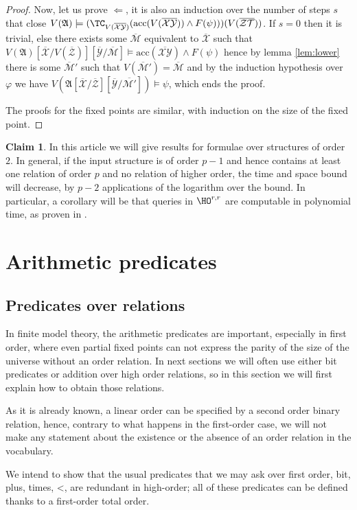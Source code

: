 \documentclass[a4paper,12pt]{article}
\theoremstyle{definition}
\newtheorem{claim}[theorem]{Claim}
\renewcommand{\phi}{\varphi}
\newcommand{\hod}[2]{\ensuremath{\HO^{#1,#2}}}
\newcommand{\mc}{\mathcal}
\newcommand{\mf}{\mathfrak}
\newcommand{\ol}{\overline}
\newcommand{\olmc}[1]{\overline{\mathcal{#1}}}
\begin{document}
\begin{proof}
Now, let us prove $\Leftarrow$, it is also an induction over the number
of steps $s$ that close $V(\mf A)\models(\TC_{V(\ol{\mc
    X}\ol{\mc Y})}(\text{acc}(V(\olmc{XY}))\land
F(\psi)))(V(\ol{\mc Z\mc T}))$. If $s=0$ then it is trivial,
else there exists some $\olmc M$ equivalent to $\olmc X$ such that
$V(\mf A)[\olmc{X}/V(\olmc Z)][\olmc
Y/\olmc{M}]\models\text{acc}(\olmc{XY})\land F(\psi)$ hence by lemma
\ref{lem:lower} there is some $\olmc M'$ such that $V(\olmc M')=\olmc
M$ and by the induction hypothesis over $\phi$ we have  $V(\mf
A[\olmc{X}/\olmc Z][\olmc Y/\olmc{M'}])\models\psi$, which ends the
proof.

The proofs for the fixed points are similar, with induction on the size
of the fixed point.
\end{proof}
\begin{claim}\label{highstructure}
  In this article we will give results for formulae over structures of
  order $2$. In general, if the input structure is of order $p-1$ and
  hence contains at least one relation of order $p$ and no relation of
  higher order, the time and space bound will decrease, by $p-2$
  applications of the logarithm over the bound. In particular, a
  corollary will be that queries in $\hod{r}{r}$ are computable in
  polynomial time, as proven in \cite{complex}.
\end{claim}


\section{Arithmetic predicates}\label{arith}
\subsection{Predicates over relations}
In finite model theory, the arithmetic predicates are important,
especially in first order, where even partial fixed points can not
express the parity of the size of the universe without an order
relation. In next sections we will often use either bit predicates or
addition over high order relations, so in this section we will first
explain how to obtain those relations.

As it is already known, a linear order can be specified by a second
order binary relation, hence, contrary to what happens in the
first-order case, we will not make any statement about the
existence or the absence of an order relation in the vocabulary.

We intend to show that the usual predicates that we may ask over first
order, bit, plus, times, <, are redundant in high-order; all of these
predicates can be defined thanks to a first-order total order.
\end{document}
